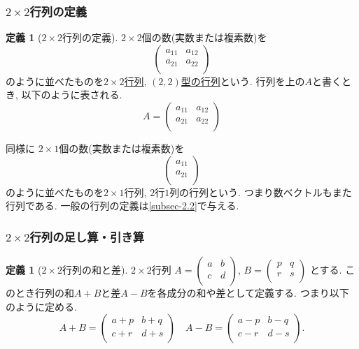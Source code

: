 \documentclass[dvipdfmx,a4paper,11pt]{article}
\theoremstyle{definition}
\newtheorem{dfn}[thm]{定義}
\begin{document}
  \subsubsection{$2\times 2$行列の定義}
  \begin{tcolorbox}[
    colback = white,
    colframe = green!35!black,
    fonttitle = \bfseries,
    breakable = true]
    \begin{dfn}[$2\times 2$行列の定義]
 $2 \times 2$個の数(実数または複素数)を
$$
\begin{pmatrix}
a_{11}&a_{12}\\
a_{21}&a_{22}\\
\end{pmatrix}
$$
のように並べたものを\underline{$2 \times 2$行列}, 
\underline{$(2,2)$型の行列}という.
行列を上の$A$と書くとき, 以下のように表される.  
$$
A = \begin{pmatrix}
a_{11}&a_{12}\\
a_{21}&a_{22}\\
\end{pmatrix}
$$

\end{dfn}
\end{tcolorbox}
同様に $2 \times 1$個の数(実数または複素数)を
$$
\begin{pmatrix}
a_{11}\\
a_{21}\\
\end{pmatrix}
$$
のように並べたものを$2 \times 1$行列, $2$行$1$列の行列という.
つまり数ベクトルもまた行列である. 
一般の行列の定義は\ref{subsec-2.2}で与える. 


  \subsubsection{$2\times 2$行列の足し算・引き算}
 \begin{tcolorbox}[
    colback = white,
    colframe = green!35!black,
    fonttitle = \bfseries,
    breakable = true]
    \begin{dfn}[$2\times 2$行列の和と差]
    \text{}
 
$2 \times 2$行列
$
A=\begin{pmatrix}
a& b \\
c& d \\
\end{pmatrix}
$, 
$
B=\begin{pmatrix}
p& q \\
r& s\\
\end{pmatrix}
$
とする.
このとき行列の和$A+B$と差$A-B$を各成分の和や差として定義する.
つまり以下のように定める. 
$$
A+B=
\begin{pmatrix}
a +p& b +q\\
c+r& d+s \\
\end{pmatrix}
\quad
A-B=
\begin{pmatrix}
a -p& b -q\\
c-r & d-s \\
\end{pmatrix}.
$$
  \end{dfn}
 \end{tcolorbox}
 
\end{document}
